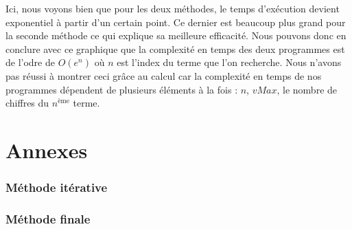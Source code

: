 \documentclass{article}
\newcommand{\code}[3]{}
\begin{document}
Ici, nous voyons bien que pour les deux méthodes, le temps d'exécution devient exponentiel à partir d'un certain point. Ce dernier est beaucoup plus grand pour la seconde méthode ce qui explique sa meilleure efficacité. Nous pouvons donc en conclure avec ce graphique que la complexité en temps des deux programmes est de l'odre de $O(e^{n})$ où $n$ est l'index du terme que l'on recherche. Nous n'avons pas réussi à montrer ceci grâce au calcul car la complexité en temps de nos programmes dépendent de plusieurs éléments à la fois : $n$, $vMax$, le nombre de chiffres du $n^{\text{ème}}$ terme.

\newpage
\part{Annexes}
\section*{Méthode itérative}
\code{1}{43}{Algos/Problem119_1_rapport.py}

\newpage
\section*{Méthode finale}
\code{1}{44}{Algos/Problem119_2_rapport.py}
\end{document}
